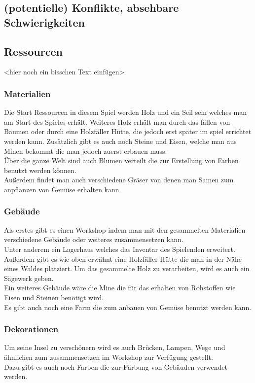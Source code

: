 \documentclass[paper=A4,pagesize=auto,12pt,headinclude=true,footinclude=true,BCOR=0mm,DIV=calc]{scrartcl}
\newcommand{\sectionspace}{
	\vspace{0.5cm}
}
\begin{document}
\sectionspace
\subsection{(potentielle) Konflikte, absehbare Schwierigkeiten}

\sectionspace
\subsection{Ressourcen}\label{sec:Ressourcen}
<hier noch ein bisschen Text einfügen>

\subsubsection{Materialien}
Die Start Ressourcen in diesem Spiel werden Holz und ein Seil sein welches man am Start des Spieles erhält. Weiteres Holz erhält man durch das fällen von Bäumen oder durch eine Holzfäller Hütte, die jedoch erst später im spiel errichtet werden kann. Zusätzlich gibt es auch noch Steine und Eisen, welche man aus Minen bekommt die man jedoch zuerst erbauen muss.\\
Über die ganze Welt sind auch Blumen verteilt die zur Erstellung von Farben benutzt werden können.\\
Außerdem findet man auch verschiedene Gräser von denen man Samen zum anpflanzen von Gemüse erhalten kann. 

\subsubsection{Gebäude}
Als erstes gibt es einen Workshop indem man mit den gesammelten Materialien verschiedene Gebäude oder weiteres zusammensetzen kann.\\
Unter anderem ein Lagerhaus welches das Inventar des Spielenden erweitert. Außerdem gibt es wie oben erwähnt eine Holzfäller Hütte die man in der Nähe eines Waldes platziert. Um das gesammelte Holz zu verarbeiten, wird es auch ein Sägewerk geben.\\
Ein weiteres Gebäude wäre die Mine die für das erhalten von Rohstoffen wie Eisen und Steinen benötigt wird.\\
Es gibt auch noch eine Farm die zum anbauen von Gemüse benutzt werden kann.

\subsubsection{Dekorationen}
Um seine Insel zu verschönern wird es auch Brücken, Lampen, Wege und ähnlichen zum zusammensetzen im Workshop zur Verfügung gestellt.\\
Dazu gibt es auch noch Farben die zur Färbung von Gebäuden verwendet werden.
\end{document}
